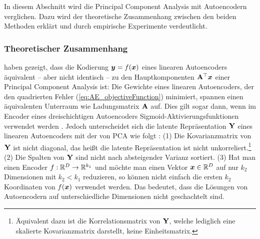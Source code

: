 In diesem Abschnitt wird die Principal Component Analysis mit Autoencodern verglichen. Dazu wird
der theoretische Zusammenhang zwischen den beiden Methoden erklärt und durch empirische Experimente
verdeutlicht.



\subsubsection{Theoretischer Zusammenhang}

\textcites{Baldi.1989}{Bourlard.1988} haben gezeigt, dass die Kodierung $\bm{y} = f(\bm{x})$ eines linearen Autoencoders äquivalent -- aber nicht identisch -- zu den Hauptkomponenten $\mathbf{A}^\top\bm{x}$ einer Principal Component Analysis ist: Die Gewichte eines linearen Autoencoders, der den quadrierten Fehler (\eqref{eq:AE_objectiveFunction}) minimiert, spannen einen äquivalenten Unterraum wie Ladungsmatrix $\mathbf{A}$ auf.
Dies gilt sogar dann, wenn im Encoder eines dreischichtigen Autoencoders Sigmoid-Aktivierungsfunktionen verwendet werden \parencite[291, 293]{Bourlard.1988}. Jedoch unterscheidet sich die latente Repräsentation $\mathbf{Y}$
eines linearen Autoencoders mit der von PCA wie folgt \parencite[3]{Plaut.2018}: (1) Die Kovarianzmatrix von $\mathbf{Y}$ ist nicht diagonal, das heißt die
latente Repräsentation ist nicht unkorreliert.\footnote{Äquivalent dazu ist die Korrelationsmatrix
	von $\mathbf{Y}$, welche lediglich eine skalierte Kovarianzmatrix darstellt, keine Einheitsmatrix.}
(2) Die Spalten von $\mathbf{Y}$ sind nicht nach absteigender Varianz sortiert. (3) Hat man einen
Encoder $f: \mathbb{R}^D \rightarrow \mathbb{R}^{k_1}$ und möchte man einen Vektor $\bm{x} \in \mathbb{R}^D$ auf
nur $k_2$ Dimensionen mit $k_2 < k_1$ reduzieren, so können nicht einfach die ersten $k_2$
Koordinaten von $f(\bm{x})$ verwendet werden. Das bedeutet, dass die Lösungen von Autoencodern
auf unterschiedliche Dimensionen nicht geschachtelt sind.

